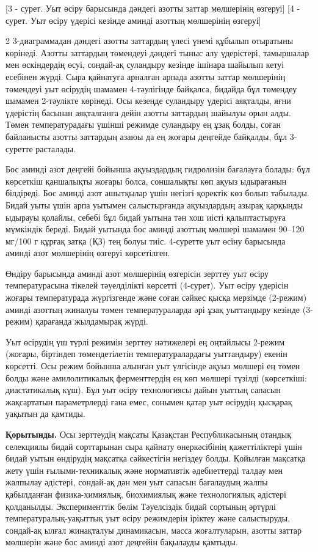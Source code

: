 [3 - сурет. Уыт өсіру барысында дәндегі
азотты заттар мөлшерінің өзгеруі]
[4 - сурет. Уыт өсіру үдерісі кезінде
аминді азоттың мөлшерінің өзгеруі]

\begin{multicols}{2}
3-диаграммадан дәндегі азотты заттардың үлесі үнемі құбылып отыратыны
көрінеді. Азотты заттардың төмендеуі дәндегі тыныс алу үдерістері,
тамыршалар мен өскіндердің өсуі, сондай-ақ суландыру кезінде ішінара
шайылып кетуі есебінен жүрді. Сыра қайнатуға арналған арпада азотты
заттар мөлшерінің төмендеуі уыт өсірудің шамамен 4-тәулігінде байқалса,
бидайда бұл төмендеу шамамен 2-тәулікте көрінеді. Осы кезеңде суландыру
үдерісі аяқталды, яғни үдерістің басынан аяқталғанға дейін азотты
заттардың шайылуы орын алды. Төмен температурадағы үшінші режимде
суландыру ең ұзақ болды, соған байланысты азотты заттардың азаюы да ең
жоғары деңгейде байқалды, бұл 3-суретте расталады.

Бос аминді азот деңгейі бойынша ақуыздардың гидролизін бағалауға болады:
бұл көрсеткіш қаншалықты жоғары болса, соншалықты көп ақуыз ыдырағанын
білдіреді. Бос аминді азот ашытқылар үшін негізгі қоректік көз болып
табылады. Бидай уыты үшін арпа уытымен салыстырғанда ақуыздардың азырақ
қарқынды ыдырауы қолайлы, себебі бұл бидай уытына тән хош иісті
қалыптастыруға мүмкіндік береді. Бидай уытында бос аминді азоттың
мөлшері шамамен 90--120 мг/100 г құрғақ затқа (ҚЗ) тең болуы тиіс.
4-суретте уыт өсіну барысында аминді азот мөлшерінің өзгеруі
көрсетілген.

Өндіру барысында аминді азот мөлшерінің өзгерісін зерттеу уыт өсіру
температурасына тікелей тәуелділікті көрсетті (4-сурет). Уыт өсіру
үдерісін жоғары температурада жүргізгенде және соған сәйкес қысқа
мерзімде (2-режим) аминді азоттың жиналуы төмен температураларда әрі
ұзақ уыттандыру кезінде (3-режим) қарағанда жылдамырақ жүрді.

Уыт өсірудің үш түрлі режимін зерттеу нәтижелері ең оңтайлысы 2-режим
(жоғары, біртіндеп төмендетілетін температуралардағы уыттандыру) екенін
көрсетті. Осы режим бойынша алынған уыт үлгісінде ақуыз мөлшері ең төмен
болды және амилолитикалық ферменттердің ең көп мөлшері түзілді
(көрсеткіші: диастатикалық күш). Бұл уыт өсіру технологиясы дайын уыттың
сапасын жақсартатын параметрлерді ғана емес, сонымен қатар уыт өсірудің
қысқарақ уақытын да қамтиды.

{\bfseries Қорытынды.} Осы зерттеудің мақсаты Қазақстан Республикасының
отандық селекциялы бидай сорттарынан сыра қайнату өнеркәсібінің
қажеттіліктері үшін бидай уытын өндірудің мақсатқа сәйкестігін негіздеу
болды. Қойылған мақсатқа жету үшін ғылыми-техникалық және нормативтік
әдебиеттерді талдау мен жалпылау әдістері, сондай-ақ дән мен уыт сапасын
бағалаудың жалпы қабылданған физика-химиялық, биохимиялық және
технологиялық әдістері қолданылды. Эксперименттік бөлім Тәуелсіздік
бидай сортының әртүрлі температуралық-уақыттық уыт өсіру режимдерін
іріктеу және салыстыруды, сондай-ақ ылғал жинақталуы динамикасын, масса
жоғалтуларын, азотты заттар мөлшерін және бос аминді азот деңгейін
бақылауды қамтыды.


\end{multicols}
